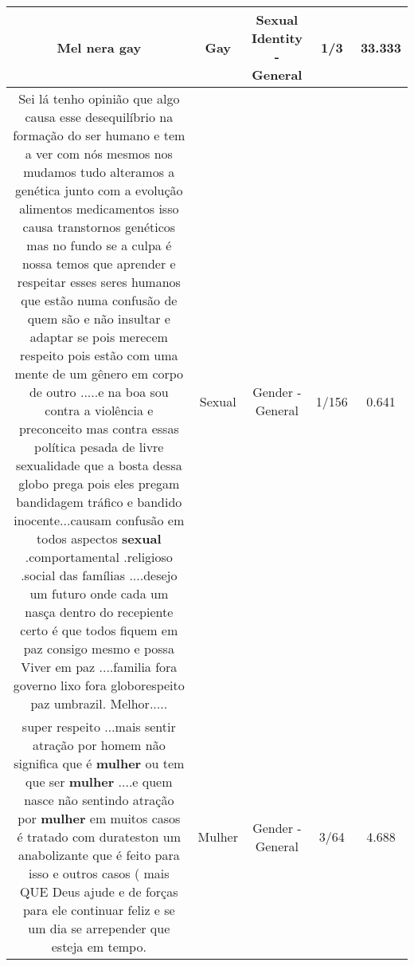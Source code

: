 \documentclass[11pt]{article}
\newlength\mylength
\begin{document}
\begin{center}
\begin{longtable}{|C{.65\mylength}|C{.30\mylength}|C{.12\mylength}|C{.12\mylength}|C{.12\mylength}|}
  \small Mel nera gay\normalsize   & Gay & Sexual Identity - General & 1/3 & 33.333 \\  \hline
  \small Sei lá tenho opinião que algo causa esse desequilíbrio na formação do ser humano e tem a ver com nós mesmos nos mudamos tudo alteramos a genética junto com a evolução alimentos medicamentos isso causa transtornos genéticos mas no fundo se a culpa é nossa temos que aprender e respeitar esses seres humanos que estão numa confusão de quem são e não insultar e adaptar se pois merecem respeito pois estão com uma mente de um gênero em corpo de outro .....e na boa sou  contra a violência e preconceito mas contra essas política pesada de livre sexualidade que a bosta dessa globo prega pois eles pregam bandidagem tráfico e bandido inocente...causam confusão em todos aspectos \textbf{sexual} .comportamental .religioso .social das famílias ....desejo um futuro onde cada um nasça dentro do recepiente certo é que todos fiquem em paz consigo mesmo e possa  Viver em paz ....familia fora governo lixo  fora globorespeito paz umbrazil. Melhor.....\normalsize   & Sexual & Gender - General & 1/156 & 0.641 \\  \hline
  \small super respeito ...mais sentir atração por homem não significa que é \textbf{mulher} ou tem que ser \textbf{mulher} ....e quem nasce não sentindo atração por \textbf{mulher} em muitos casos é tratado com durateston um anabolizante que é feito para isso e outros casos ( mais QUE Deus ajude e de forças para ele continuar feliz e se um dia se arrepender que esteja em tempo.\normalsize   & Mulher & Gender - General & 3/64 & 4.688 \\  \hline

\end{longtable}
\end{center}
\end{document}

